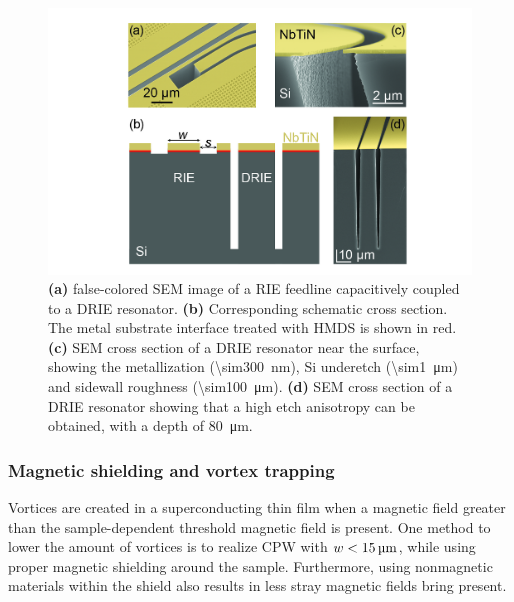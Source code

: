   \begin{figure}[h]
    \centering
    \includegraphics[width=.92\textwidth]{Figures/DRIE/DRIE figure.jpg}
    \caption{\textbf{(a)} false-colored SEM image of a RIE feedline capacitively coupled to a DRIE resonator. \textbf{(b)} Corresponding schematic cross section. The metal substrate interface treated with HMDS is shown in red. \textbf{(c)} SEM cross section of a DRIE resonator near the surface, showing the metallization (\SI{\sim300}{\nano \meter}), Si underetch (\SI{\sim1}{\micro \meter}) and sidewall roughness (\SI{\sim100}{\micro \meter}). \textbf{(d)} SEM cross section of a DRIE resonator showing that a high etch anisotropy can be obtained, with a depth of \SI{80}{\micro \meter}.}
    \label{fig:DRIE schematic}
  \end{figure}

  \subsubsection{Magnetic shielding and vortex trapping}

  Vortices are created in a superconducting thin film when a magnetic field greater than the sample-dependent threshold magnetic field is present. One method to lower the amount of vortices is to realize CPW with $w < \text{\ensuremath{\SI{15}{\micro \meter}}}$, while using proper magnetic shielding around the sample. Furthermore, using nonmagnetic materials within the shield also results in less stray magnetic fields bring present.

